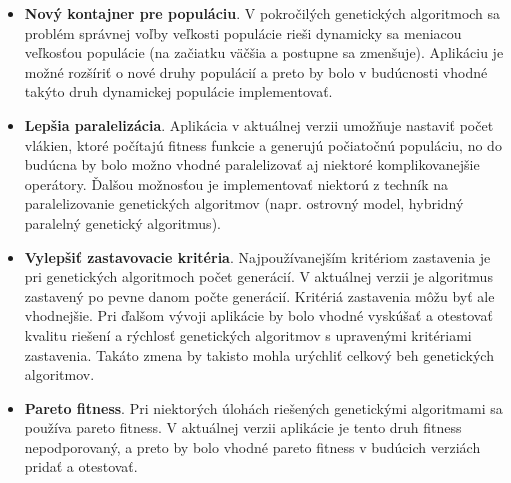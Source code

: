 \begin{itemize}
\item \textbf{Nový kontajner pre populáciu}. V pokročilých genetických algoritmoch sa problém správnej voľby veľkosti populácie rieši dynamicky sa meniacou veľkosťou populácie (na začiatku väčšia a postupne sa zmenšuje). Aplikáciu je možné rozšíriť o nové druhy populácií a preto by bolo v budúcnosti vhodné takýto druh dynamickej populácie implementovať.
\item \textbf{Lepšia paralelizácia}. Aplikácia v aktuálnej verzii umožňuje nastaviť počet vlákien, ktoré počítajú fitness funkcie a generujú počiatočnú populáciu, no do budúcna by bolo možno vhodné paralelizovať aj niektoré komplikovanejšie operátory. Ďalšou možnosťou je implementovať niektorú z techník na paralelizovanie genetických algoritmov (napr. ostrovný model, hybridný paralelný genetický algoritmus).
\item \textbf{Vylepšiť zastavovacie kritéria}. Najpoužívanejším kritériom zastavenia je pri genetických algoritmoch počet generácií. V aktuálnej verzii je algoritmus zastavený po pevne danom počte generácií. Kritériá zastavenia môžu byť ale vhodnejšie. Pri ďalšom vývoji aplikácie by bolo vhodné vyskúšať a otestovať kvalitu riešení a rýchlosť genetických algoritmov s upravenými kritériami zastavenia. Takáto zmena by takisto mohla urýchliť celkový beh genetických algoritmov.
\item \textbf{Pareto fitness}. Pri niektorých úlohách riešených genetickými algoritmami sa používa pareto fitness. V aktuálnej verzii aplikácie je tento druh fitness nepodporovaný, a preto by bolo vhodné pareto fitness v budúcich verziách pridať a otestovať.
\end{itemize}